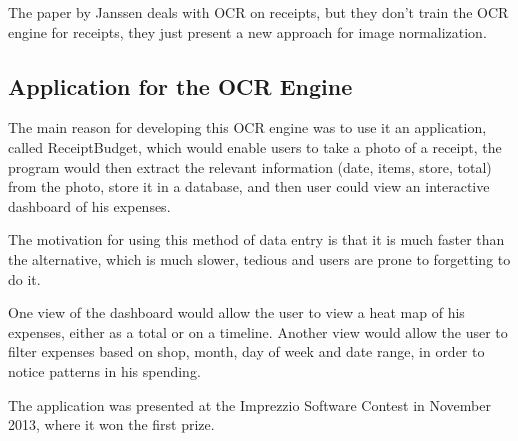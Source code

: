 The paper by Janssen\cite{janssen2012receipts2go} deals with OCR on receipts, but they don't train the OCR engine for receipts, they just present a new approach for image normalization.

\subsection{Application for the OCR Engine}
The main reason for developing this OCR engine was to use it an application, called ReceiptBudget, which would enable users to take a photo of a receipt, the program would then extract the relevant information (date, items, store, total) from the photo, store it in a database, and then user could view an interactive dashboard of his expenses.

The motivation for using this method of data entry is that it is much faster than the alternative, which is much slower, tedious and users are prone to forgetting to do it. 

One view of the dashboard would allow the user to view a heat map of his expenses, either as a total or on a timeline. Another view would allow the user to filter expenses based on shop, month, day of week and date range, in order to notice patterns in his spending. 

The application was presented at the Imprezzio Software Contest in November 2013, where it won the first prize\cite{WinNT}.
